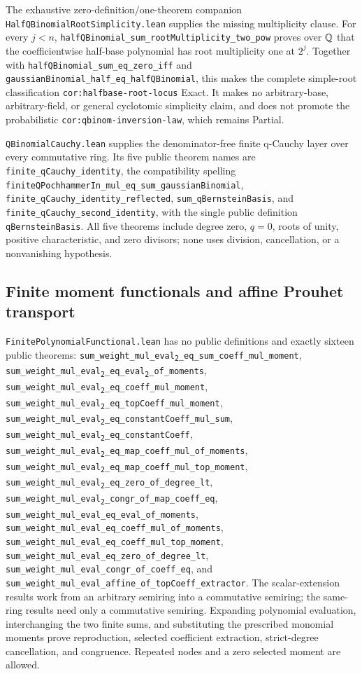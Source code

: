 \documentclass[11pt,oneside]{article}
\theoremstyle{definition}
\theoremstyle{remark}
\newcommand{\leansubtwo}[2]{%
  \nolinkurl{#1}\texttt{\textsubscript{2}}\nolinkurl{#2}}
\begin{document}
The exhaustive zero-definition/one-theorem companion
\nolinkurl{HalfQBinomialRootSimplicity.lean} supplies the missing multiplicity
clause.  For every \(j<n\),
\nolinkurl{halfQBinomial_sum_rootMultiplicity_two_pow} proves over
\(\mathbb{Q}\) that the coefficientwise half-base polynomial has root
multiplicity one at \(2^j\).  Together with
\nolinkurl{halfQBinomial_sum_eq_zero_iff} and
\nolinkurl{gaussianBinomial_half_eq_halfQBinomial}, this makes the complete
simple-root classification \nolinkurl{cor:halfbase-root-locus} Exact.  It
makes no arbitrary-base, arbitrary-field, or general cyclotomic simplicity
claim, and does not promote the probabilistic
\nolinkurl{cor:qbinom-inversion-law}, which remains Partial.

\nolinkurl{QBinomialCauchy.lean} supplies the denominator-free finite
q-Cauchy layer over every commutative ring.  Its five public theorem names are
\nolinkurl{finite_qCauchy_identity}, the compatibility spelling
\nolinkurl{finiteQPochhammerIn_mul_eq_sum_gaussianBinomial},
\nolinkurl{finite_qCauchy_identity_reflected},
\nolinkurl{sum_qBernsteinBasis}, and
\nolinkurl{finite_qCauchy_second_identity}, with the single public definition
\nolinkurl{qBernsteinBasis}.  All five theorems include degree zero,
\(q=0\), roots of unity, positive characteristic, and zero divisors; none
uses division, cancellation, or a nonvanishing hypothesis.

\subsection{Finite moment functionals and affine Prouhet transport}
\nolinkurl{FinitePolynomialFunctional.lean} has no public definitions and
exactly sixteen public theorems:
\leansubtwo{sum_weight_mul_eval}{_eq_sum_coeff_mul_moment},
\leansubtwo{sum_weight_mul_eval}{_eq_eval}\texttt{\textsubscript{2}}\nolinkurl{_of_moments},
\leansubtwo{sum_weight_mul_eval}{_eq_coeff_mul_moment},
\leansubtwo{sum_weight_mul_eval}{_eq_topCoeff_mul_moment},
\leansubtwo{sum_weight_mul_eval}{_eq_constantCoeff_mul_sum},
\leansubtwo{sum_weight_mul_eval}{_eq_constantCoeff},
\leansubtwo{sum_weight_mul_eval}{_eq_map_coeff_mul_of_moments},
\leansubtwo{sum_weight_mul_eval}{_eq_map_coeff_mul_top_moment},
\leansubtwo{sum_weight_mul_eval}{_eq_zero_of_degree_lt},
\leansubtwo{sum_weight_mul_eval}{_congr_of_map_coeff_eq},
\nolinkurl{sum_weight_mul_eval_eq_eval_of_moments},
\nolinkurl{sum_weight_mul_eval_eq_coeff_mul_of_moments},
\nolinkurl{sum_weight_mul_eval_eq_coeff_mul_top_moment},
\nolinkurl{sum_weight_mul_eval_eq_zero_of_degree_lt},
\nolinkurl{sum_weight_mul_eval_congr_of_coeff_eq}, and
\nolinkurl{sum_weight_mul_eval_affine_of_topCoeff_extractor}.
The scalar-extension results work from an arbitrary semiring into a
commutative semiring; the same-ring results need only a commutative semiring.
Expanding polynomial evaluation, interchanging the two finite sums, and
substituting the prescribed monomial moments prove reproduction, selected
coefficient extraction, strict-degree cancellation, and congruence.  Repeated
nodes and a zero selected moment are allowed.
\end{document}
